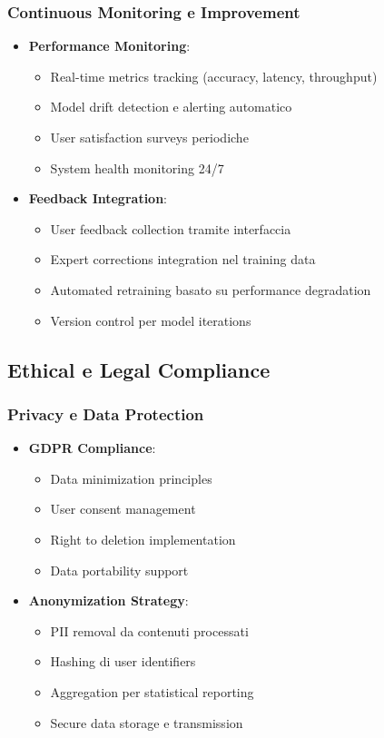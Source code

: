 \documentclass[12pt,a4paper]{report}
\begin{document}
\subsubsection{Continuous Monitoring e Improvement}

\begin{itemize}
    \item \textbf{Performance Monitoring}:
    \begin{itemize}
        \item Real-time metrics tracking (accuracy, latency, throughput)
        \item Model drift detection e alerting automatico
        \item User satisfaction surveys periodiche
        \item System health monitoring 24/7
    \end{itemize}
    
    \item \textbf{Feedback Integration}:
    \begin{itemize}
        \item User feedback collection tramite interfaccia
        \item Expert corrections integration nel training data
        \item Automated retraining basato su performance degradation
        \item Version control per model iterations
    \end{itemize}
\end{itemize}

\subsection{Ethical e Legal Compliance}

\subsubsection{Privacy e Data Protection}

\begin{itemize}
    \item \textbf{GDPR Compliance}:
    \begin{itemize}
        \item Data minimization principles
        \item User consent management
        \item Right to deletion implementation
        \item Data portability support
    \end{itemize}
    
    \item \textbf{Anonymization Strategy}:
    \begin{itemize}
        \item PII removal da contenuti processati
        \item Hashing di user identifiers
        \item Aggregation per statistical reporting
        \item Secure data storage e transmission
    \end{itemize}
\end{itemize}
\end{document}
